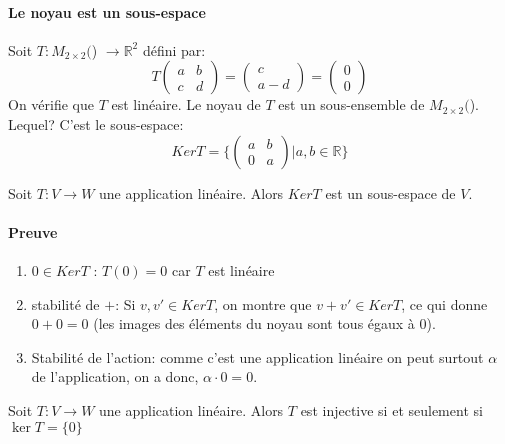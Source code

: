 
\paragraph{Le noyau est un sous-espace}
\begin{exemple}
Soit $T : M_{2\times 2}($\R) $\to \mathbb{R}^2$ défini par:
\[T\begin{pmatrix}
    a & b \\ c & d
\end{pmatrix} = \begin{pmatrix}
    c \\ a-d
\end{pmatrix} = \begin{pmatrix}
    0 \\ 0
\end{pmatrix}\]
On vérifie que $T$ est linéaire. Le noyau de $T$ est un sous-ensemble de $M_{2\times 2}($\R). Lequel? C'est le sous-espace:
\[Ker T = \{ \begin{pmatrix}
    a & b \\ 0 & a
\end{pmatrix}|a, b \in \mathbb{R}\}\]
\end{exemple}

\begin{theoreme}
    Soit $T: V \to W$ une application linéaire. Alors $KerT$ est un sous-espace de $V$.
\end{theoreme}

\paragraph{Preuve}
\begin{enumerate}
    \item $0 \in Ker T$ : $T(0) = 0$ car $T$ est linéaire
    \item stabilité de $+$: Si $v, v' \in KerT$, on montre que $v+v' \in KerT$, ce qui donne $0 + 0 = 0$ (les images des éléments du noyau sont tous égaux à 0).
    \item Stabilité de l'action: comme c'est une application linéaire on peut surtout $\alpha$ de l'application, on a donc, $\alpha \cdot 0 = 0$.
\end{enumerate}


\begin{definition}
Soit $T : V \to W$ une application linéaire. Alors $T$ est injective si et seulement si $\ker T = \{0\}$ 
\end{definition}

